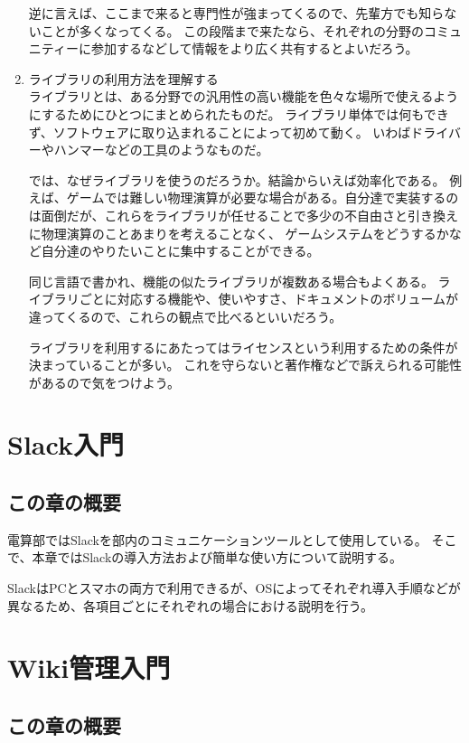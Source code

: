 \documentclass[lualatex,ja=standard,12pt,a4j]{bxjsbook}
\begin{document}
\begin{enumerate}
                逆に言えば、ここまで来ると専門性が強まってくるので、先輩方でも知らないことが多くなってくる。
                この段階まで来たなら、それぞれの分野のコミュニティーに参加するなどして情報をより広く共有するとよいだろう。
				
				\item ライブラリの利用方法を理解する\\
		        ライブラリとは、ある分野での汎用性の高い機能を色々な場所で使えるようにするためにひとつにまとめられたものだ。
		        ライブラリ単体では何もできず、ソフトウェアに取り込まれることによって初めて動く。
		        いわばドライバーやハンマーなどの工具のようなものだ。
		        
		        では、なぜライブラリを使うのだろうか。結論からいえば効率化である。
		        例えば、ゲームでは難しい物理演算が必要な場合がある。自分達で実装するのは面倒だが、これらをライブラリが任せることで多少の不自由さと引き換えに物理演算のことあまりを考えることなく、
		        ゲームシステムをどうするかなど自分達のやりたいことに集中することができる。
		        
		        同じ言語で書かれ、機能の似たライブラリが複数ある場合もよくある。
		        ライブラリごとに対応する機能や、使いやすさ、ドキュメントのボリュームが違ってくるので、これらの観点で比べるといいだろう。 
		        
		        ライブラリを利用するにあたってはライセンスという利用するための条件が決まっていることが多い。
		        これを守らないと著作権などで訴えられる可能性があるので気をつけよう。           
			\end{enumerate}
	\chapter{Slack入門}
		\section{この章の概要}
			電算部ではSlackを部内のコミュニケーションツールとして使用している。
            そこで、本章ではSlackの導入方法および簡単な使い方について説明する。
            
            SlackはPCとスマホの両方で利用できるが、OSによってそれぞれ導入手順などが異なるため、各項目ごとにそれぞれの場合における説明を行う。
	\chapter{Wiki管理入門}
		\section{この章の概要}
\end{document}
